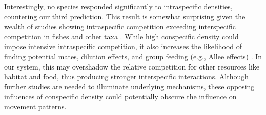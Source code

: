 \documentclass[11pt, class=article, crop=false]{standalone}
\begin{document}

Interestingly, no species responded significantly to intraspecific densities, countering our third prediction. This result is somewhat surprising given the wealth of studies showing intraspecific competition exceeding interspecific competition in fishes \citep{websterMechanismsIndividualConsequences2000, wardIntraspecificFoodCompetition2006} and other taxa \citep{adlerCompetitionCoexistencePlant2018, barabasEffectIntraInterspecific2016, thompsonProcessbasedMetacommunityFramework2020, chessonRolesHarshFluctuating1997, tilmanResourceCompetitionCommunity1982, mcpeekIntraspecificDensityDependence2012}. While high conspecific density could impose intensive intraspecific competition, it also increases the likelihood of finding potential mates, dilution effects, and group feeding (e.g., Allee effects) \citep{courchampAlleeEffectsEcology2008, gascoigneAlleeEffectsDriven2004, teruiCrypticAlleeEffect2015}. In our system, this may overshadow the relative competition for other resources like habitat and food, thus producing stronger interspecific interactions. Although further studies are needed to illuminate underlying mechanisms, these opposing influences of conspecific density could potentially obscure the influence on movement patterns. 
\end{document}
